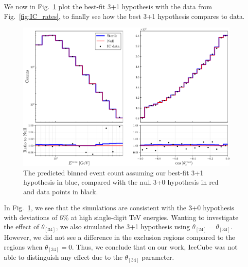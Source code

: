 We now in Fig.~\ref{fig:final_rate_plot} plot the best-fit 3+1 hypothesis with the data from Fig.~\ref{fig:IC_rates}, to finally see how the best 
3+1 hypothesis compares to data.
\begin{figure}
    \centering
    \includegraphics[width=1\textwidth]{figures/final_rate_plot.pdf}
    \caption{The predicted binned event count assuming our best-fit 3+1 hypothesis in blue, compared with the 
    null 3+0 hypothesis in red and data points in black.}\label{fig:final_rate_plot}
\end{figure}

In Fig.~\ref{fig:final_rate_plot}, we see that the simulations are consistent with the 3+0 hypothesis with deviations of 6\% at high single-digit 
\si{\TeV} energies.
Wanting to investigate the effect of $\theta_[34]$, we also simulated the 3+1 hypothesis using $\theta_[24] = \theta_[34]$. However, we did not see 
a difference in the exclusion regions compared to the regions when $\theta_[34] = 0$. Thus, we conclude that on our work, IceCube was not able to 
distinguish any effect due to the $\theta_[34]$ parameter.